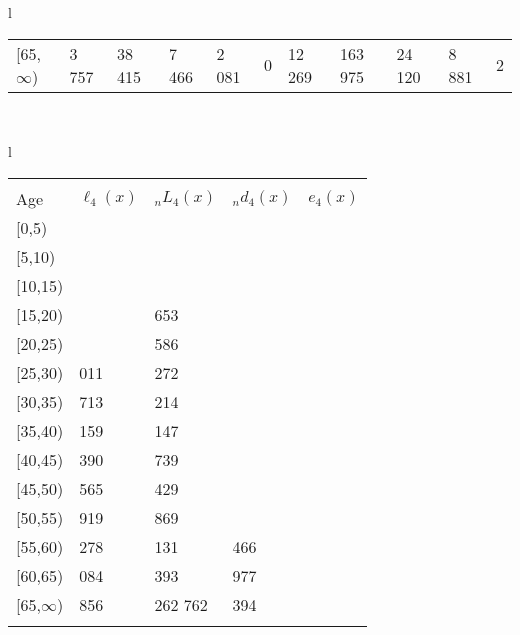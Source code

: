 \documentclass[
]{article}
\begin{document}
\begin{table}
\begin{tabular}[t]{l}
\begin{tabular}
{}[65,$\infty$) & 3 757 & 38 415 & 7 466 & 2 081 & 0 & 12 269 & 163 975 & 24 120 & 8 881 & 2\\
\end{tabular}\\
\end{tabular}
\centering
\begin{tabular}[t]{l}
\hline
\begin{tabular}{>{\raggedright\arraybackslash}p{.43in}>{\raggedleft\arraybackslash}p{1.3in}>{\raggedleft\arraybackslash}p{1.3in}>{\raggedleft\arraybackslash}p{1.3in}>{\raggedleft\arraybackslash}p{1.3in}}
\toprule
\multicolumn{1}{c}{ } & \multicolumn{4}{c}{(4) Lost both} \\
\cmidrule(l{3pt}r{3pt}){2-5}
Age & $\ell_{4}(x)$ & ${}_nL_{4}(x)$ & ${}_nd_{4}(x)$ & $e_{4}(x)$\\
\midrule
{}[0,5) & 0 & 141 & 0 & 20\\
{}[5,10) & 67 & 463 & 0 & 20\\
{}[10,15) & 118 & 750 & 0 & 20\\
{}[15,20) & 220 & 1 653 & 1 & 20\\
{}[20,25) & 497 & 3 586 & 4 & 20\\
\addlinespace
{}[25,30) & 1 011 & 7 272 & 10 & 20\\
{}[30,35) & 1 713 & 13 214 & 24 & 20\\
{}[35,40) & 3 159 & 23 147 & 51 & 20\\
{}[40,45) & 5 390 & 41 739 & 116 & 20\\
{}[45,50) & 9 565 & 70 429 & 269 & 20\\
\addlinespace
{}[50,55) & 15 919 & 116 869 & 656 & 19\\
{}[55,60) & 26 278 & 173 131 & 1 466 & 19\\
{}[60,65) & 38 084 & 240 393 & 2 977 & 17\\
{}[65,$\infty$) & 50 856 & 1 262 762 & 68 394 & 16\\
\bottomrule
\multicolumn{5}{l}{\rule{0pt}{1em}\textsuperscript{*} Based on an estimated from SIPP with less than 10 respondents in the numerator.}\\
\end{tabular}\\
\end{tabular}
\end{table}
\end{document}
